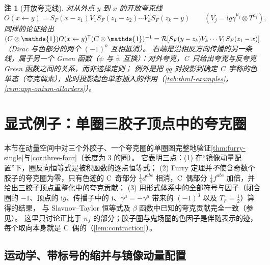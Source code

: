 \documentclass[UTF8,a4paper,11pt,fontset=fandol]{ctexart}
\let\amsmathbb\mathbb
\renewcommand{\mathbb}[1]{\ifx1#1\mathds{1}\else\amsmathbb{#1}\fi}
\theoremstyle{cplain}
\theoremstyle{cdefinition}
\theoremstyle{cremark}
\newtheorem{remark}[theorem]{注}
\numberwithin{equation}{section}
\newcommand{\tp}{\mathsf{T}}                         %
\newcommand{\Rop}{\mathcal{R}}                       %
\newcommand{\SF}{S_{F}}                              %
\newcommand{\ii}{\mathrm{i}}                        %
\newcommand{\Cconj}[1]{\widetilde{#1}}              %
\begin{document}
\begin{remark}[开放夸克线]\label{rem:thmI-open-lines}
对从外点 $y$ 到 $x$ 的开放夸克线
\[
O(x\leftarrow y)=\SF(x-z_1)V_1\SF(z_1-z_2)\cdots V_k\SF(z_k-y)\qquad(V_j=\ii g\gamma^{\mu_j}\otimes T^{a_j}),
\]
同样的论证给出
$(C\otimes\mathbb 1)O(x\leftarrow y)^{\tp}(C\otimes\mathbb 1)^{-1}=\Rop[\SF(y-z_k)V_k\cdots V_1\SF(z_1-x)]$（Dirac 与色部分的两个 $(-1)^k$ 互相抵消）。
右端是沿相反方向传播的另一条线，属于另一个 Green 函数（$\psi$ 与 $\bar\psi$ 互换）：对外夸克，C~只给出夸克与反夸克 Green 函数之间的\emph{关系}，而非选择定则；
例外是把 $q\bar q$ 对投影到确定 C~宇称的色单态（夸克偶素），此时投影起色单态插入的作用（\cref{tab:thmI-examples}，\cref{rem:app-onium-allorders}）。
\end{remark}

\section{显式例子：单圈三胶子顶点中的夸克圈}\label{sec:triangle}

本节在动量空间中对三个外胶子、一个夸克圈的单圈图完整地验证\cref{thm:furry-single}与\cref{cor:three-four}（长度为 $3$ 的圈）。
它表明三点：(1) 在“镜像动量配置”下，圈反向恒等式是被积函数的逐点恒等式；
(2) Furry 定理并\emph{不}使含奇数个胶子的夸克圈为零，只有色迹的 C~奇部分 $\frac14d^{abc}$ 相消，C~偶部分 $\frac{\ii}{4}f^{abc}$ 加倍，并给出三胶子顶点重整化中的夸克贡献；
(3) 用形式体系中的全部符号与因子（闭合圈的 $-1$、顶点的 $\ii g$、传播子中的 $\ii$、$\Cconj{\gamma^\mu}=-\gamma^\mu$ 带来的 $(-1)^3$ 以及 $T_F=\frac12$）算得的结果，
与 Slavnov--Taylor 恒等式及 $\beta$ 函数中已知的夸克贡献完全一致（参见\cite{DavydychevOslandSaks2001,PeskinSchroeder1995}）。
这里只讨论正比于 $n_f$ 的部分；胶子圈与鬼场圈的色因子是伴随表示的迹，每个取向本身就是 C~偶的（\cref{lem:contraction}）。

\subsection{运动学、带标号的缩并与镜像动量配置}\label{sec:triangle-setup}
\end{document}

